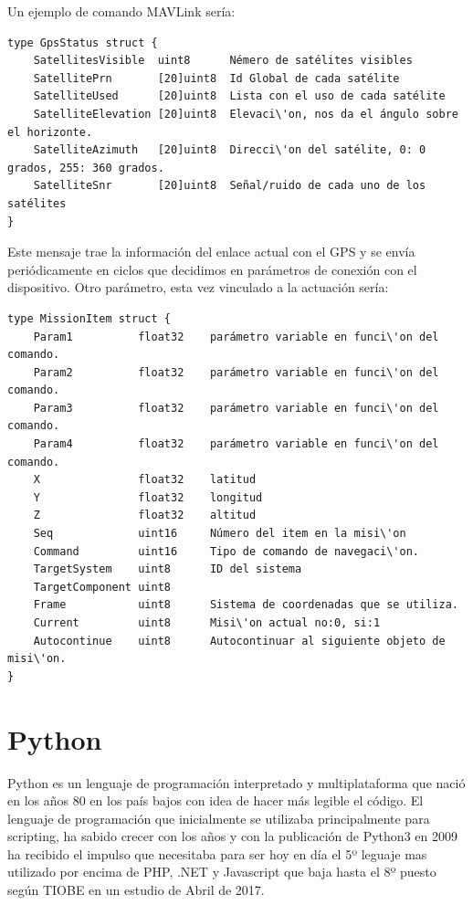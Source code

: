 Un ejemplo de comando MAVLink ser\'ia:
{\scriptsize
\begin{verbatim}
type GpsStatus struct {
    SatellitesVisible  uint8      Némero de satélites visibles
    SatellitePrn       [20]uint8  Id Global de cada satélite
    SatelliteUsed      [20]uint8  Lista con el uso de cada satélite
    SatelliteElevation [20]uint8  Elevaci\'on, nos da el ángulo sobre el horizonte.
    SatelliteAzimuth   [20]uint8  Direcci\'on del satélite, 0: 0 grados, 255: 360 grados.
    SatelliteSnr       [20]uint8  Señal/ruido de cada uno de los satélites
}
\end{verbatim}}
Este mensaje trae la informaci\'on del enlace actual con el GPS y se env\'ia peri\'odicamente en ciclos que decidimos en par\'ametros de conexi\'on con el dispositivo.
Otro par\'ametro, esta vez vinculado a la actuaci\'on ser\'ia:
{\scriptsize
\begin{verbatim}
type MissionItem struct {
    Param1          float32    parámetro variable en funci\'on del comando.
    Param2          float32    parámetro variable en funci\'on del comando.
    Param3          float32    parámetro variable en funci\'on del comando.
    Param4          float32    parámetro variable en funci\'on del comando.
    X               float32    latitud
    Y               float32    longitud
    Z               float32    altitud
    Seq             uint16     Número del item en la misi\'on
    Command         uint16     Tipo de comando de navegaci\'on.
    TargetSystem    uint8      ID del sistema
    TargetComponent uint8      
    Frame           uint8      Sistema de coordenadas que se utiliza.
    Current         uint8      Misi\'on actual no:0, si:1
    Autocontinue    uint8      Autocontinuar al siguiente objeto de misi\'on.
}
\end{verbatim}}

\section{Python}
\label{sec:python}

Python es un lenguaje de programaci\'on interpretado y multiplataforma que naci\'o en los años 80 en los país bajos con idea de hacer más legible el c\'odigo.
El lenguaje de programaci\'on que inicialmente se utilizaba principalmente para scripting, ha sabido crecer con los años y con la publicaci\'on de Python3 en 2009 ha recibido el impulso que necesitaba para ser hoy en día el 5º leguaje mas utilizado por encima de PHP, .NET y Javascript que baja hasta el 8º puesto según TIOBE en un estudio de Abril de 2017.

